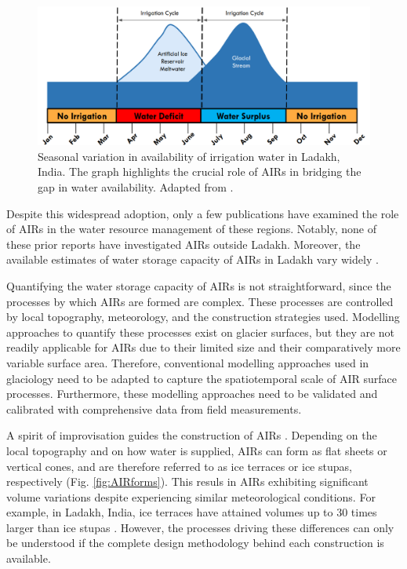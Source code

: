 \begin{figure}[htb] \centering \includegraphics[width=\textwidth]{figs/irrigation_cycles.png}
	\caption{Seasonal variation in availability of irrigation water in Ladakh, India. The graph highlights the
		crucial role of \ac{AIRs} in bridging the gap in water availability. Adapted from
		\citet{nusserLocalKnowledgeGlobal2016}.} \label{fig:irrigation_cycles} \end{figure}


Despite this widespread adoption, only a few publications have examined the role of \ac{AIRs} in the water resource
management of these regions. Notably, none of these prior reports have investigated \ac{AIRs} outside Ladakh.
Moreover, the available estimates of water storage capacity of \ac{AIRs} in Ladakh vary widely
\citep{norphelSnowWaterHarvesting2015, baglaArtificialGlaciersHelp1998}.

Quantifying the water storage capacity of \ac{AIRs} is not straightforward, since the processes by which
\ac{AIRs} are formed are complex. These processes are controlled by local topography, meteorology, and the
construction strategies used. Modelling approaches to quantify these processes exist on glacier surfaces, but
they are not readily applicable for \ac{AIRs} due to their limited size and their comparatively more variable surface
area. Therefore, conventional modelling approaches used in glaciology need to be adapted to capture the
spatiotemporal scale of AIR surface processes. Furthermore, these modelling approaches need to be validated and
calibrated with comprehensive data from field measurements.

A spirit of improvisation guides the construction of \ac{AIRs} \citep{clouseLadakhArtificialGlaciers2017}.
Depending on the local topography and on how water is supplied, \ac{AIRs} can form as flat sheets or vertical
cones, and are therefore referred to as ice terraces or ice stupas, respectively (Fig. \ref{fig:AIRforms}). This
resuls in \ac{AIRs} exhibiting significant volume variations despite experiencing similar
meteorological conditions. For example, in Ladakh, India, ice terraces have attained volumes up to 30 times
larger than ice stupas \citep{nusserSociohydrologyArtificialGlaciers2019}. However, the processes driving these
differences can only be understood if the complete design methodology behind each construction is available.


